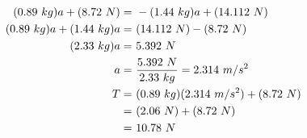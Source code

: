 	\begin{align}
		(0.89 \ kg)a + (8.72 \ N) = \ &-(1.44 \ kg)a + (14.112 \ N)& \notag \\
		(0.89 \ kg)a + (1.44 \ kg)a = \ & (14.112 \ N) - (8.72 \ N)& \notag \\
		(2.33 \ kg)a = \ & 5.392 \ N& \notag \\
		a = \ & \frac{5.392 \ N}{2.33 \ kg} = 2.314 \ m/s^{2}& \notag \\
		T = \ &(0.89 \ kg)(2.314 \ m/s^{2}) + (8.72 \ N)& \notag \\
		= \ &(2.06 \ N) + (8.72 \ N)& \notag \\
		= \ &10.78 \ N&
	\end{align}
